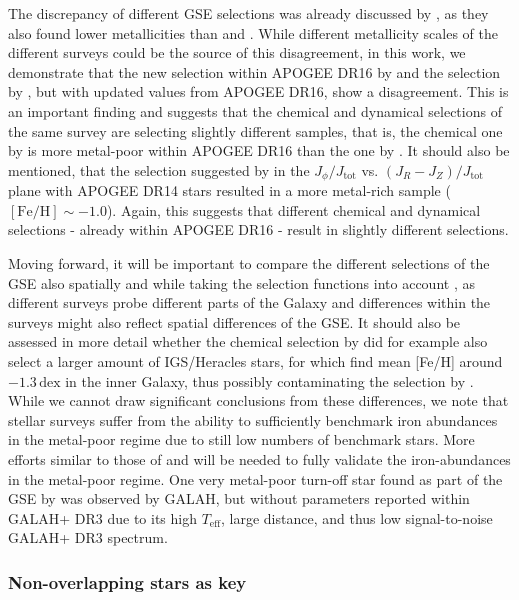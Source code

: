 \documentclass[fleqn,usenatbib]{mnras}
\newcommand{\dex}{\,\mathrm{dex}}	%
\begin{document}
The discrepancy of different GSE selections was already discussed by \citet{Bonifacio2021}, as they also found lower metallicities than \citet{Naidu2020} and \citet{Feuillet2020}. While different metallicity scales of the different surveys could be the source of this disagreement, in this work, we demonstrate that the new selection within APOGEE DR16 by \citet{Feuillet2021} and the selection by \citet{Das2020}, but with updated values from APOGEE DR16, show a disagreement. This is an important finding and suggests that the chemical and dynamical selections of the same survey are selecting slightly different samples, that is, the chemical one by \citet{Das2020} is more metal-poor within APOGEE DR16 than the one by \citet{Feuillet2021}. It should also be mentioned, that the selection suggested by \citet{Myeong2019} in the $J_\phi/J_\text{tot}$ vs. $\left(J_R - J_Z\right)/J_\text{tot}$ plane with APOGEE DR14 stars resulted in a more metal-rich sample ($\mathrm{[Fe/H]} \sim -1.0$). Again, this suggests that different chemical and dynamical selections - already within APOGEE DR16 - result in slightly different selections.

Moving forward, it will be important to compare the different selections of the GSE also spatially and while taking the selection functions into account \citep[e.g.][]{Lane2021}, as different surveys probe different parts of the Galaxy and differences within the surveys might also reflect spatial differences of the GSE. It should also be assessed in more detail whether the chemical selection by \citet{Das2020} did for example also select a larger amount of IGS/Heracles stars, for which \citet{Horta2021} find mean [Fe/H] around $-1.3\dex$ in the inner Galaxy, thus possibly contaminating the selection by \citet{Das2020}. While we cannot draw significant conclusions from these differences, we note that stellar surveys suffer from the ability to sufficiently benchmark iron abundances in the metal-poor regime due to still low numbers of benchmark stars. More efforts similar to those of \citet{Hawkins2016} and \citet{Karovicova2020} will be needed to fully validate the iron-abundances in the metal-poor regime. One very metal-poor turn-off star found as part of the GSE by \citet{Naidu2020} was observed by GALAH, but without parameters reported within GALAH+ DR3 due to its high $T_\text{eff}$, large distance, and thus low signal-to-noise GALAH+ DR3 spectrum.

\subsubsection{Non-overlapping stars as key} \label{sec:non_overlap}
\end{document}
